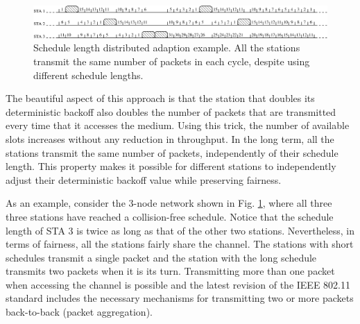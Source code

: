 \documentclass[journal]{IEEEtran}
\begin{document}
\begin{figure}[!t]
\centering
\includegraphics[width=6.0in]{figures/csma_eca_different_backoff}
\caption{Schedule length distributed adaption example. All the stations transmit the same number of packets in each cycle, despite using different schedule lengths.}
\label{fig:csma_eca_different_backoff}
\end{figure}

The beautiful aspect of this approach is that the station that doubles its deterministic backoff also doubles the number of packets that are transmitted every time that it accesses the medium.
Using this trick, the number of available slots increases without any reduction in throughput.
In the long term, all the stations transmit the same number of packets, independently of their schedule length.
This property makes it possible for different stations to independently adjust their deterministic backoff value while preserving fairness.

As an example, consider the 3-node network shown in Fig. \ref{fig:csma_eca_different_backoff}, where all three three stations have reached a collision-free schedule.
Notice that the schedule length of STA 3 is twice as long as that of the other two stations.
Nevertheless, in terms of fairness, all the stations fairly share the channel.
The stations with short schedules transmit a single packet and the station with the long schedule transmits two packets when it is its turn.
Transmitting more than one packet when accessing the channel is possible and the latest revision of the IEEE 802.11 standard includes the necessary mechanisms for transmitting two or more packets back-to-back (packet aggregation).

\end{document}

